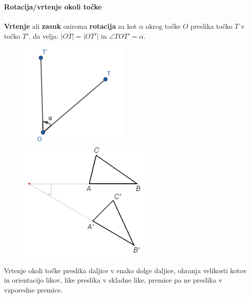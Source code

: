         \begin{frame}
            \large\textbf{Rotacija/vrtenje okoli točke}
            ~\\
            ~\\
            \normalsize
            \textbf{Vrtenje} ali \textbf{zasuk} oziroma \textbf{rotacija} za kot $\alpha$ okrog točke $O$ preslika točko $T$ v točko $T'$, da velja: $\left\lvert OT\right\rvert = \left\lvert OT'\right\rvert$  in $\angle TOT' = \alpha$.


            \begin{figure}
                \includegraphics[scale=0.6]{Slike in skice/Rotacija tocke_okoli_tocke.png}
                \includegraphics[scale=0.6]{Slike in skice/Rotacija_lika_okoli_tocke.png}
            \end{figure}

            Vrtenje okoli točke preslika daljice v enako dolge daljice, ohranja velikosti kotov in orientacijo likov, like preslika v skladne like, premice pa ne preslika v vzporedne premice. 

        \end{frame}

            

